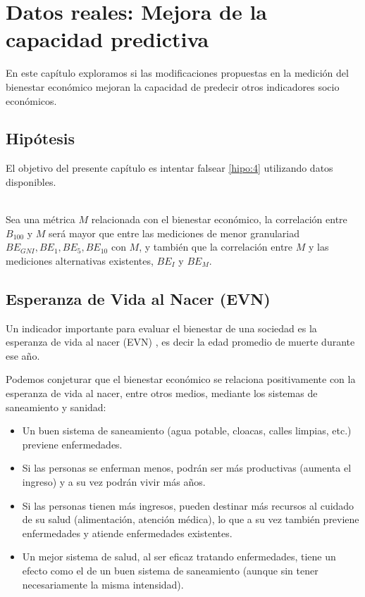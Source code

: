 \chapter{Datos reales: Mejora de la capacidad predictiva} \label{chapter:datos_reales_otros_indicadores}

En este capítulo exploramos si las modificaciones propuestas en la medición del bienestar económico mejoran la capacidad de predecir otros indicadores socio económicos.

\section{Hipótesis}

El objetivo del presente capítulo es intentar falsear \ref{hipo:4} utilizando datos disponibles.

\begin{hipotesis}\label{hipo:4}
    \\
    Sea una métrica $M$ relacionada con el bienestar económico, la correlación entre $B_{100}$ y $M$ será mayor que entre las mediciones de menor granulariad $BE_{GNI}, BE_1, BE_5, BE_{10}$ con $M$, y también que la correlación entre $M$ y las mediciones alternativas existentes, $BE_I$ y $BE_M$.
\end{hipotesis}


\section{Esperanza de Vida al Nacer (EVN)} \label{section:esperanza_vida_nacer}

Un indicador importante para evaluar el bienestar de una sociedad es la esperanza de vida al nacer (EVN) \cite{worldbank_health_data}, es decir la edad promedio de muerte durante ese año. 

Podemos conjeturar que el bienestar económico se relaciona positivamente con la esperanza de vida al nacer, entre otros medios, mediante los sistemas de saneamiento y sanidad:

\begin{itemize}
    \item Un buen sistema de saneamiento (agua potable, cloacas, calles limpias, etc.) previene enfermedades.
    \item Si las personas se enferman menos, podrán ser más productivas (aumenta el ingreso) y a su vez podrán vivir más años.
    \item Si las personas tienen más ingresos, pueden destinar más recursos al cuidado de su salud (alimentación, atención médica), lo que a su vez también previene enfermedades y atiende enfermedades existentes.
    \item Un mejor sistema de salud, al ser eficaz tratando enfermedades, tiene un efecto como el de un buen sistema de saneamiento (aunque sin tener necesariamente la misma intensidad).
\end{itemize}

